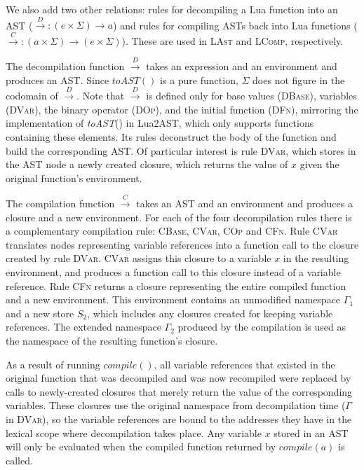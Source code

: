 \documentclass[english]{llncs}
\begin{document}
We also add two other relations: rules for decompiling a Lua function
into an AST ($\overset{D}{\rightarrow}:(e\times\Sigma)\rightarrow a$)
and rules for compiling ASTs back into Lua functions ($\overset{C}{\rightarrow}:(a\times\Sigma)\rightarrow(e\times\Sigma)$).
These are used in \textsc{LAst} and \textsc{LComp}, respectively.

The decompilation function $\overset{D}{\rightarrow}$ takes an expression
and an environment and produces an AST. Since $toAST()$ is a pure
function, $\Sigma$ does not figure in the codomain of $\overset{D}{\rightarrow}$.
Note that $\overset{D}{\rightarrow}$ is defined only for base values
(\textsc{DBase}), variables (\textsc{DVar}), the binary operator (\textsc{DOp}),
and the initial function (\textsc{DFn}), mirroring the implementation
of \emph{toAST}() in Lua2AST, which only supports functions containing
these elements. Its rules deconstruct the body of the function and
build the corresponding AST. Of particular interest is rule \textsc{DVar},
which stores in the AST node a newly created closure, which returns
the value of $x$ given the original function's environment.

The compilation function $\overset{C}{\rightarrow}$ takes an AST
and an environment and produces a closure and a new environment. For
each of the four decompilation rules there is a complementary compilation
rule: \textsc{CBase}, \textsc{CVar}, \textsc{COp} and \textsc{CFn}.
Rule \textsc{CVar} translates nodes representing variable references
into a function call to the closure created by rule \textsc{DVar}.
\textsc{CVar} assigns this closure to a variable $x$ in the resulting
environment, and produces a function call to this closure instead
of a variable reference. Rule \textsc{CFn} returns a closure representing
the entire compiled function and a new environment. This environment
contains an unmodified namespace $\Gamma_{1}$ and a new store $S_{2}$,
which includes any closures created for keeping variable references.
The extended namespace $\Gamma_{2}$ produced by the compilation is
used as the namespace of the resulting function's closure.

As a result of running $compile()$, all variable references that
existed in the original function that was decompiled and was now recompiled
were replaced by calls to newly-created closures that merely return
the value of the corresponding variables. These closures use the original
namespace from decompilation time ($\Gamma$ in \textsc{DVar}), so
the variable references are bound to the addresses they have in the
lexical scope where decompilation takes place. Any variable $x$ stored
in an AST will only be evaluated when the compiled function returned
by $compile(a)$ is called.
\end{document}

